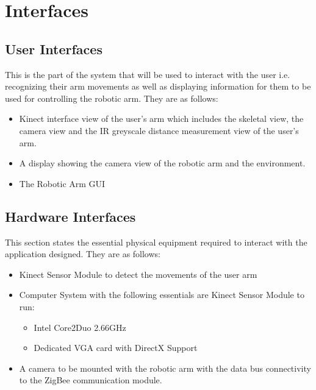 \documentclass[a4wide]{scrreprt}
\begin{document}

\section{Interfaces}

\subsection{User Interfaces}
This is the part of the system that will be used to interact with the user i.e. recognizing their arm movements as well as displaying information for them to be used for controlling the robotic arm. They are as follows:
\begin{itemize}
\item Kinect interface view of the user's arm  which includes the skeletal view, the camera view and the IR greyscale distance measurement view of the user's arm.
\item A display showing the camera view of the robotic arm and the environment.
\item The Robotic Arm GUI 
\end{itemize}

\subsection{Hardware Interfaces}
This section states the essential physical equipment required to interact with the application designed. They are as follows:
\begin{itemize}
\item Kinect Sensor Module to detect the movements of the user arm
\item Computer System with the following essentials are Kinect Sensor Module to run:
\begin{itemize}
\item  Intel Core2Duo 2.66GHz
\item  Dedicated VGA card with DirectX Support
\end{itemize}
\item A camera to be mounted with the robotic arm with the data bus connectivity to the ZigBee communication module.
\end{itemize}
\end{document}
